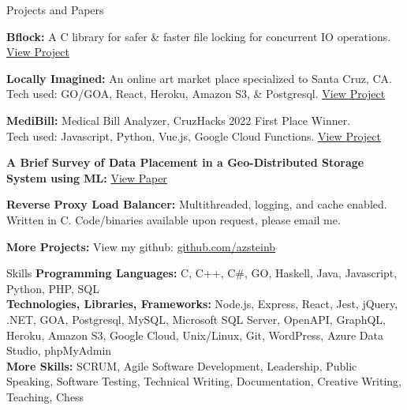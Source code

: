 \documentclass{resume} %
\begin{document}
\begin{rSection}{Projects and Papers}

    {\bf{Bflock:}} A C library for safer \& faster file locking for concurrent IO operations. \href{https://github.com/azsteinb/BetterFileLocks}{View Project}
    
    {\bf{Locally Imagined:}} An online art market place specialized to Santa Cruz, CA.
    \\ Tech used: GO/GOA, React, Heroku, Amazon S3, \& Postgresql. \href{https://github.com/locally-imagined}{View Project}
    
    {\bf{MediBill:}} Medical Bill Analyzer, CruzHacks 2022 First Place Winner.
    \\Tech used: Javascript, Python, Vue.js, Google Cloud Functions. \href{https://devpost.com/software/health-hacker-7soucr}{View Project}
    
    {\bf{A Brief Survey of Data Placement in a Geo-Distributed Storage System using ML}: } \href{https://docs.google.com/document/u/1/d/e/2PACX-1vRi_JSl3urSJMr-Mj7rZGkyrPzMANauaqdgXekPwFfHyUSlrkR0azLyoCxT_S0u2tvndypQ5d6vsJwy/pub}{View Paper}
    
    {\bf{Reverse Proxy Load Balancer:} } Multithreaded, logging, and cache enabled. Written in C. Code/binaries available upon request, please email me.
    
    {\bf{More Projects:} } View my github: \href{https://github.com/azsteinb}{github.com/azsteinb}
\end{rSection}

\begin{rSection}{Skills}
    {\bf{Programming Languages:} } C, C++, C\#, GO, Haskell, Java, Javascript, Python, PHP, SQL
    \\{\bf{Technologies, Libraries, Frameworks:} } Node.js, Express, React, Jest, jQuery, .NET, GOA, Postgresql, MySQL, Microsoft SQL Server, OpenAPI, GraphQL, Heroku, Amazon S3, Google Cloud, Unix/Linux, Git, WordPress, Azure Data Studio, phpMyAdmin
    \\{\bf{More Skills:} } SCRUM, Agile Software Development, Leadership, Public Speaking, Software Testing, Technical Writing, Documentation, Creative Writing, Teaching, Chess
\end{rSection}
    
\end{document}
